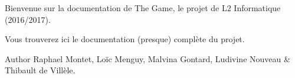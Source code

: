 Bienvenue sur la documentation de The Game, le projet de L2 Informatique (2016/2017).

Vous trouverez ici le documentation (presque) complète du projet.

\begin{DoxyAuthor}{Author}
Raphael Montet, Loïc Menguy, Malvina Gontard, Ludivine Nouveau \& Thibault de Villèle. 
\end{DoxyAuthor}
